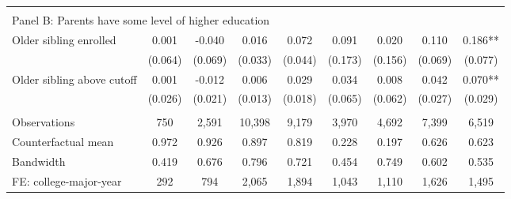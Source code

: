 {{\begin{tabular}{lcccccccc}
&  &  &  & & & & & &    \\
\multicolumn{9}{l}{Panel B: Parents have some level of higher education} \\
Older sibling enrolled&       0.001   &      -0.040   &       0.016   &       0.072   &       0.091   &       0.020   &       0.110   &       0.186** \\
                    &     (0.064)   &     (0.069)   &     (0.033)   &     (0.044)   &     (0.173)   &     (0.156)   &     (0.069)   &     (0.077)   \\
 
Older sibling above cutoff&       0.001   &      -0.012   &       0.006   &       0.029   &       0.034   &       0.008   &       0.042   &       0.070** \\
                    &     (0.026)   &     (0.021)   &     (0.013)   &     (0.018)   &     (0.065)   &     (0.062)   &     (0.027)   &     (0.029)   \\
                    &               &               &               &               &               &               &               &               \\
Observations        &         750   &       2,591   &      10,398   &       9,179   &       3,970   &       4,692   &       7,399   &       6,519   \\
Counterfactual mean &       0.972   &       0.926   &       0.897   &       0.819   &       0.228   &       0.197   &       0.626   &       0.623   \\
Bandwidth           &       0.419   &       0.676   &       0.796   &       0.721   &       0.454   &       0.749   &       0.602   &       0.535   \\
FE: college-major-year&         292   &         794   &       2,065   &       1,894   &       1,043   &       1,110   &       1,626   &       1,495   \\
 

\bottomrule
\end{tabular}
}
}
